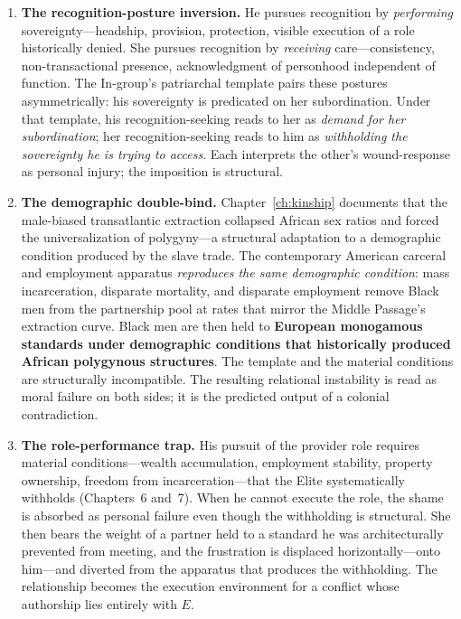 \begin{enumerate}
    \item \textbf{The recognition-posture inversion.} He pursues recognition by \textit{performing} sovereignty---headship, provision, protection, visible execution of a role historically denied. She pursues recognition by \textit{receiving} care---consistency, non-transactional presence, acknowledgment of personhood independent of function. The In-group's patriarchal template pairs these postures asymmetrically: his sovereignty is predicated on her subordination. Under that template, his recognition-seeking reads to her as \textit{demand for her subordination}; her recognition-seeking reads to him as \textit{withholding the sovereignty he is trying to access}. Each interprets the other's wound-response as personal injury; the imposition is structural.
    
    \item \textbf{The demographic double-bind.} Chapter~\ref{ch:kinship} documents that the male-biased transatlantic extraction collapsed African sex ratios and forced the universalization of polygyny---a structural adaptation to a demographic condition produced by the slave trade. The contemporary American carceral and employment apparatus \textit{reproduces the same demographic condition}: mass incarceration, disparate mortality, and disparate employment remove Black men from the partnership pool at rates that mirror the Middle Passage's extraction curve. Black men are then held to \textbf{European monogamous standards under demographic conditions that historically produced African polygynous structures}. The template and the material conditions are structurally incompatible. The resulting relational instability is read as moral failure on both sides; it is the predicted output of a colonial contradiction.
    
    \item \textbf{The role-performance trap.} His pursuit of the provider role requires material conditions---wealth accumulation, employment stability, property ownership, freedom from incarceration---that the Elite systematically withholds (Chapters~6 and~7). When he cannot execute the role, the shame is absorbed as personal failure even though the withholding is structural. She then bears the weight of a partner held to a standard he was architecturally prevented from meeting, and the frustration is displaced horizontally---onto him---and diverted from the apparatus that produces the withholding. The relationship becomes the execution environment for a conflict whose authorship lies entirely with $E$.
    

\end{enumerate}
